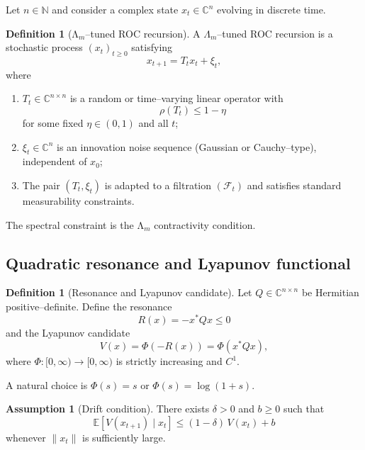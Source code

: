 \documentclass[11pt]{article}
\theoremstyle{plain}
\theoremstyle{definition}
\newtheorem{definition}[theorem]{Definition}
\newtheorem{assumption}[theorem]{Assumption}
\numberwithin{equation}{section}
\begin{document}
Let $n \in \mathbb{N}$ and consider a complex state
$x_t \in \mathbb{C}^n$ evolving in discrete time.

\begin{definition}[Λ$_m$--tuned ROC recursion]
A $\Lambda_m$--tuned ROC recursion is a stochastic process
$(x_t)_{t\ge0}$ satisfying
\begin{equation}
  x_{t+1} = T_t x_t + \xi_t,
  \label{eq:roc-recursion}
\end{equation}
where
\begin{enumerate}[label=(\alph*)]
  \item $T_t \in \mathbb{C}^{n\times n}$ is a random or
  time--varying linear operator with
  \[
  \rho(T_t) \le 1 - \eta
  \]
  for some fixed $\eta \in (0,1)$ and all $t$;

  \item $\xi_t \in \mathbb{C}^n$ is an innovation noise sequence
  (Gaussian or Cauchy--type), independent of $x_0$;

  \item The pair $(T_t,\xi_t)$ is adapted to a filtration
  $(\mathcal{F}_t)$ and satisfies standard measurability constraints.
\end{enumerate}
\end{definition}

The spectral constraint is the Λ$_m$ contractivity condition.

\subsection{Quadratic resonance and Lyapunov functional}

\begin{definition}[Resonance and Lyapunov candidate]
Let $Q \in \mathbb{C}^{n\times n}$ be Hermitian positive--definite.
Define the resonance
\begin{equation}
  R(x) = - x^\ast Q x \le 0
\end{equation}
and the Lyapunov candidate
\begin{equation}
  V(x) = \Phi(-R(x)) = \Phi(x^\ast Q x),
\end{equation}
where $\Phi : [0,\infty) \to [0,\infty)$ is strictly increasing and
$C^1$.
\end{definition}

A natural choice is $\Phi(s) = s$ or $\Phi(s) = \log(1+s)$.

\begin{assumption}[Drift condition]
There exists $\delta > 0$ and $b \ge 0$ such that
\begin{equation}
  \mathbb{E}[V(x_{t+1}) \mid x_t] \le (1-\delta)\, V(x_t) + b
  \label{eq:lyap-drift}
\end{equation}
whenever $\|x_t\|$ is sufficiently large.
\end{assumption}
\end{document}
